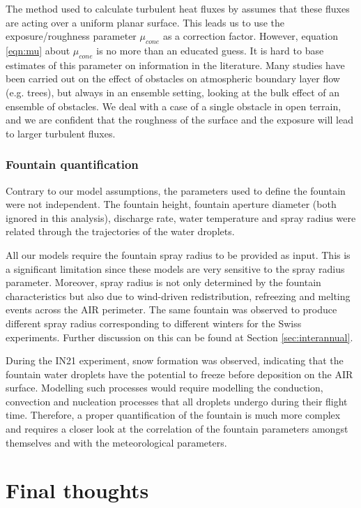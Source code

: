 The method used to calculate turbulent heat fluxes by \citet{garrattAtmosphericBoundaryLayer1992} assumes that
these fluxes are acting over a uniform planar surface. This leads us to use the exposure/roughness parameter
$\mu_{cone}$ as a correction factor. However, equation \ref{eqn:mu} about $\mu_{cone}$ is no more than an educated guess. It
is hard to base estimates of this parameter on information in the literature. Many studies have been carried out
on the effect of obstacles on atmospheric boundary layer flow (e.g. trees), but always in an ensemble setting,
looking at the bulk effect of an ensemble of obstacles. We deal with a case of a single obstacle in open
terrain, and we are confident that the roughness of the surface and the exposure will lead to larger turbulent
fluxes.

\subsubsection{Fountain quantification}

Contrary to our model assumptions, the parameters used to define the fountain were not independent. The fountain
height, fountain aperture diameter (both ignored in this analysis), discharge rate, water temperature and spray
radius were related through the trajectories of the water droplets.

All our models require the fountain spray radius to be provided as input. This is a significant limitation
since these models are very sensitive to the spray radius parameter. Moreover, spray radius is not only determined
by the fountain characteristics but also due to wind-driven redistribution, refreezing and melting events across
the AIR perimeter. The same fountain was observed to produce different spray radius corresponding to different
winters for the Swiss experiments. Further discussion on this can be found at Section \ref{sec:interannual}.

During the IN21 experiment, snow formation was observed, indicating that the fountain water droplets have the
potential to freeze before deposition on the AIR surface. Modelling such processes would require modelling the
conduction, convection and nucleation processes that all droplets undergo during their flight time. Therefore, a
proper quantification of the fountain is much more complex and requires a closer look at the correlation of the
fountain parameters amongst themselves and with the meteorological parameters.


\section{Final thoughts}

